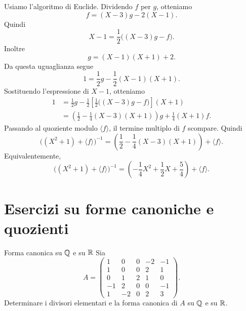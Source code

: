 \documentclass[a4paper]{article}
\begin{document}
\begin{radioactive}
\begin{snippetsolution}{}
    Usiamo l'algoritmo di Euclide. Dividendo \(f\) per \(g\), otteniamo
    \[
        f=(X-3)g-2(X-1).
    \]
    Quindi
    \[
        X-1=\frac{1}{2}\big((X-3)g-f\big).
    \]
    Inoltre
    \[
        g=(X-1)(X+1)+2.
    \]
    Da questa uguaglianza segue
    \[
        1=\frac{1}{2}g-\frac{1}{2}(X-1)(X+1).
    \]
    Sostituendo l'espressione di \(X-1\), otteniamo
    \begin{align*}
        1
        &=
        \frac{1}{2}g
        -
        \frac{1}{2}
        \left[
            \frac{1}{2}\big((X-3)g-f\big)
        \right](X+1) \\
        &=
        \left(
            \frac{1}{2}
            -
            \frac{1}{4}(X-3)(X+1)
        \right)g
        +
        \frac{1}{4}(X+1)f.
    \end{align*}
    Passando al quoziente modulo \(\langle f \rangle\), il termine multiplo di \(f\) scompare. Quindi
    \[
        \big((X^2+1)+\langle f \rangle\big)^{-1}
        =
        \left(
            \frac{1}{2}
            -
            \frac{1}{4}(X-3)(X+1)
        \right)
        +\langle f \rangle.
    \]
    Equivalentemente,
    \[
        \big((X^2+1)+\langle f \rangle\big)^{-1}
        =
        \left(
            -\frac{1}{4}X^2+\frac{1}{2}X+\frac{5}{4}
        \right)
        +\langle f \rangle.
    \]
\end{snippetsolution}
\end{radioactive}

\pagebreak

\section{Esercizi su forme canoniche e quozienti}

\begin{radioactive}
\begin{snippetexercise}{Forma canonica su \(\mathbb{Q}\) e su \(\mathbb{R}\)}
    Sia
    \[
        A=
        \begin{pmatrix}
            1 & 0 & 0 & -2 & -1\\
            1 & 0 & 0 & 2 & 1\\
            0 & 1 & 2 & 1 & 0\\
            -1 & 2 & 0 & 0 & -1\\
            1 & -2 & 0 & 2 & 3
        \end{pmatrix}.
    \]
    Determinare i divisori elementari e la forma canonica di \(A\) su \(\mathbb{Q}\) e su \(\mathbb{R}\).
\end{snippetexercise}
\end{radioactive}
\end{document}

